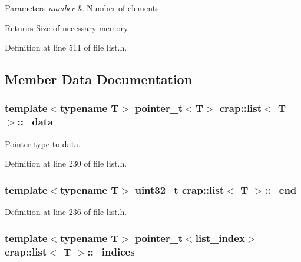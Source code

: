 \begin{DoxyParams}{Parameters}
{\em number} & Number of elements \\
\hline
\end{DoxyParams}
\begin{DoxyReturn}{Returns}
Size of necessary memory 
\end{DoxyReturn}


Definition at line 511 of file list.\+h.



\subsection{Member Data Documentation}
\hypertarget{classcrap_1_1list_af2d97cc0bbfc61a2c087c58e682b8336}{
\subsubsection[{\+\_\+data}]{\setlength{\rightskip}{0pt plus 5cm}template$<$typename T$>$ {\bf pointer\+\_\+t}$<$T$>$ {\bf crap\+::list}$<$ T $>$\+::\+\_\+data\hspace{0.3cm}{\ttfamily [protected]}}}\label{classcrap_1_1list_af2d97cc0bbfc61a2c087c58e682b8336}


Pointer type to data. 



Definition at line 230 of file list.\+h.

\hypertarget{classcrap_1_1list_a787116724be64ac6cfd3dd47ea90f13c}{
\subsubsection[{\+\_\+end}]{\setlength{\rightskip}{0pt plus 5cm}template$<$typename T$>$ uint32\+\_\+t {\bf crap\+::list}$<$ T $>$\+::\+\_\+end\hspace{0.3cm}{\ttfamily [protected]}}}\label{classcrap_1_1list_a787116724be64ac6cfd3dd47ea90f13c}


Definition at line 236 of file list.\+h.

\hypertarget{classcrap_1_1list_a2875e0226ccb2e4c5a74e33073bfdc6f}{
\subsubsection[{\+\_\+indices}]{\setlength{\rightskip}{0pt plus 5cm}template$<$typename T$>$ {\bf pointer\+\_\+t}$<${\bf list\+\_\+index}$>$ {\bf crap\+::list}$<$ T $>$\+::\+\_\+indices\hspace{0.3cm}{\ttfamily [protected]}}}\label{classcrap_1_1list_a2875e0226ccb2e4c5a74e33073bfdc6f}


